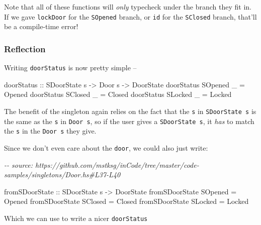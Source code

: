 \documentclass[]{article}
\newenvironment{Shaded}{}{}
\newcommand{\CommentTok}[1]{\textcolor[rgb]{0.38,0.63,0.69}{\textit{#1}}}
\newcommand{\DataTypeTok}[1]{\textcolor[rgb]{0.56,0.13,0.00}{#1}}
\newcommand{\NormalTok}[1]{#1}
\newcommand{\OtherTok}[1]{\textcolor[rgb]{0.00,0.44,0.13}{#1}}
\begin{document}
Note that all of these functions will \emph{only} typecheck under the branch
they fit in. If we gave \texttt{lockDoor} for the \texttt{SOpened} branch, or
\texttt{id} for the \texttt{SClosed} branch, that'll be a compile-time error!

\subsubsection{Reflection}\label{reflection}

Writing \texttt{doorStatus} is now pretty simple --

\begin{Shaded}
\begin{Highlighting}[]
\OtherTok{doorStatus ::} \DataTypeTok{SDoorState}\NormalTok{ s }\OtherTok{{-}\textgreater{}} \DataTypeTok{Door}\NormalTok{ s }\OtherTok{{-}\textgreater{}} \DataTypeTok{DoorState}
\NormalTok{doorStatus }\DataTypeTok{SOpened}\NormalTok{ \_ }\OtherTok{=} \DataTypeTok{Opened}
\NormalTok{doorStatus }\DataTypeTok{SClosed}\NormalTok{ \_ }\OtherTok{=} \DataTypeTok{Closed}
\NormalTok{doorStatus }\DataTypeTok{SLocked}\NormalTok{ \_ }\OtherTok{=} \DataTypeTok{Locked}
\end{Highlighting}
\end{Shaded}

The benefit of the singleton again relies on the fact that the \texttt{s} in
\texttt{SDoorState\ s} is the same as the \texttt{s} in \texttt{Door\ s}, so if
the user gives a \texttt{SDoorState\ s}, it \emph{has} to match the \texttt{s}
in the \texttt{Door\ s} they give.

Since we don't even care about the \texttt{door}, we could also just write:

\begin{Shaded}
\begin{Highlighting}[]
\CommentTok{{-}{-} source: https://github.com/mstksg/inCode/tree/master/code{-}samples/singletons/Door.hs\#L37{-}L40}

\OtherTok{fromSDoorState ::} \DataTypeTok{SDoorState}\NormalTok{ s }\OtherTok{{-}\textgreater{}} \DataTypeTok{DoorState}
\NormalTok{fromSDoorState }\DataTypeTok{SOpened} \OtherTok{=} \DataTypeTok{Opened}
\NormalTok{fromSDoorState }\DataTypeTok{SClosed} \OtherTok{=} \DataTypeTok{Closed}
\NormalTok{fromSDoorState }\DataTypeTok{SLocked} \OtherTok{=} \DataTypeTok{Locked}
\end{Highlighting}
\end{Shaded}

Which we can use to write a nicer \texttt{doorStatus}
\end{document}
